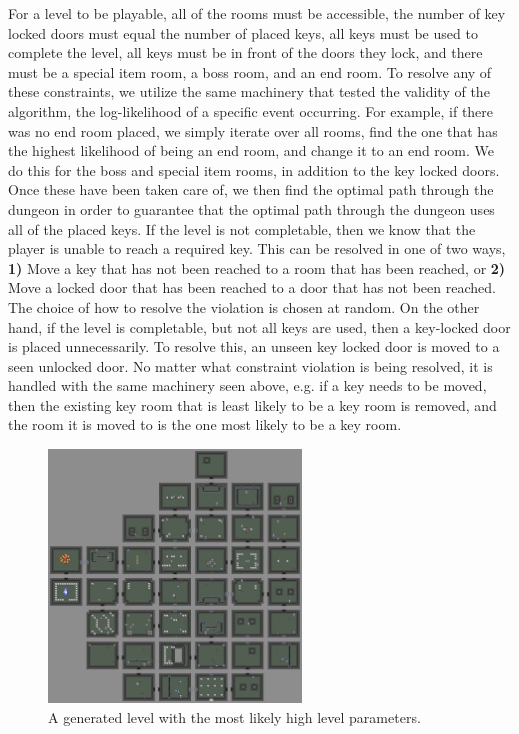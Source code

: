 \documentclass[12pt]{report}
\begin{document}
For a level to be playable, all of the rooms must be accessible, the number of key locked doors must equal the number of placed keys, all keys must be used to complete the level, all keys must be in front of the doors they lock, and there must be a special item room, a boss room, and an end room. To resolve any of these constraints, we utilize the same machinery that tested the validity of the algorithm, the log-likelihood of a specific event occurring. For example, if there was no end room placed, we simply iterate over all rooms, find the one that has the highest likelihood of being an end room, and change it to an end room. We do this for the boss and special item rooms, in addition to the key locked doors. Once these have been taken care of, we then find the optimal path through the dungeon in order to guarantee that the optimal path through the dungeon uses all of the placed keys. If the level is not completable, then we know that the player is unable to reach a required key. This can be resolved in one of two ways, \textbf{1)} Move a key that has not been reached to a room that has been reached, or \textbf{2)} Move a locked door that has been reached to a door that has not been reached. The choice of how to resolve the violation is chosen at random. On the other hand, if the level is completable, but not all keys are used, then a key-locked door is placed unnecessarily.  To resolve this, an unseen key locked door is moved to a seen unlocked door. No matter what constraint violation is being resolved, it is handled with the same machinery seen above, e.g. if a key needs to be moved, then the existing key room that is least likely to be a key room is removed, and the room it is moved to is the one most likely to be a key room.


\begin{figure}[htbp!]
\centering
    \includegraphics[width=0.6\textwidth]{figures/lttp1.png}
    \caption{A generated level with the most likely high level parameters.}
  \label{fig:dungeon}
\end{figure}
\end{document}
